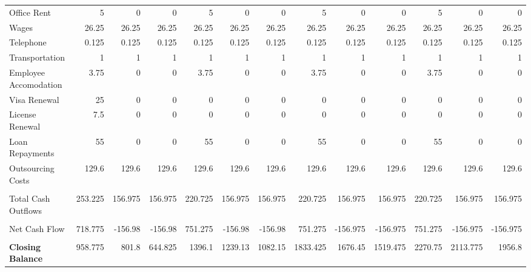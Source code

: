 \begin{table}[htbp]
\begin{tabular}{|l|r|r|r|r|r|r|r|r|r|r|r|r|}
    \midrule
          &       &       &       &       &       &       &       &       &       &       &       &  \\
    \midrule
    Office Rent  & 5     & 0     & 0     & 5     & 0     & 0     & 5     & 0     & 0     & 5     & 0     & 0 \\
    \midrule
    Wages & 26.25 & 26.25 & 26.25 & 26.25 & 26.25 & 26.25 & 26.25 & 26.25 & 26.25 & 26.25 & 26.25 & 26.25 \\
    \midrule
    Telephone & 0.125 & 0.125 & 0.125 & 0.125 & 0.125 & 0.125 & 0.125 & 0.125 & 0.125 & 0.125 & 0.125 & 0.125 \\
    \midrule
    Transportation & 1     & 1     & 1     & 1     & 1     & 1     & 1     & 1     & 1     & 1     & 1     & 1 \\
    \midrule
    Employee Accomodation & 3.75  & 0     & 0     & 3.75  & 0     & 0     & 3.75  & 0     & 0     & 3.75  & 0     & 0 \\
    \midrule
    Visa Renewal & 25    & 0     & 0     & 0     & 0     & 0     & 0     & 0     & 0     & 0     & 0     & 0 \\
    \midrule
    License Renewal & 7.5   & 0     & 0     & 0     & 0     & 0     & 0     & 0     & 0     & 0     & 0     & 0 \\
    \midrule
    Loan Repayments & 55    & 0     & 0     & 55    & 0     & 0     & 55    & 0     & 0     & 55    & 0     & 0 \\
    \midrule
    Outsourcing Costs & 129.6 & 129.6 & 129.6 & 129.6 & 129.6 & 129.6 & 129.6 & 129.6 & 129.6 & 129.6 & 129.6 & 129.6 \\
    \midrule
          &       &       &       &       &       &       &       &       &       &       &       &  \\
    \midrule
    Total Cash Outflows & 253.225 & 156.975 & 156.975 & 220.725 & 156.975 & 156.975 & 220.725 & 156.975 & 156.975 & 220.725 & 156.975 & 156.975 \\
    \midrule
          &       &       &       &       &       &       &       &       &       &       &       &  \\
    \midrule
    Net Cash Flow & 718.775 & -156.98 & -156.98 & 751.275 & -156.98 & -156.98 & 751.275 & -156.975 & -156.975 & 751.275 & -156.975 & -156.975 \\
    \midrule
          &       &       &       &       &       &       &       &       &       &       &       &  \\
    \midrule
    \textbf{Closing Balance} & 958.775 & 801.8 & 644.825 & 1396.1 & 1239.13 & 1082.15 & 1833.425 & 1676.45 & 1519.475 & 2270.75 & 2113.775 & 1956.8 \\
    \bottomrule
    \end{tabular}%
  \label{tab:addlabel}%
\end{table}%

